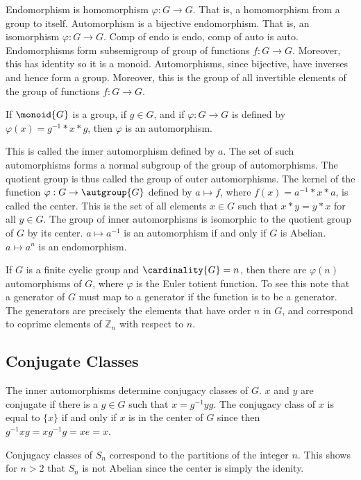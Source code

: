 \documentclass{book}                                                           %
\begin{document}
            Endomorphism is homomorphism $\varphi:G\rightarrow{G}$. That is,
            a homomorphism from a group to itself. Automorphism is a
            bijective endomorphism. That is, an isomorphism
            $\varphi:G\rightarrow{G}$. Comp of endo is endo, comp of auto is
            auto. Endomorphisms form subsemigroup of group of functions
            $f:G\rightarrow{G}$. Moreover, this has identity so it is a
            monoid. Automorphisms, since bijective, have inverses and hence
            form a group. Moreover, this is the group of all invertible
            elements of the group of functions $f:G\rightarrow{G}$.
            \begin{theorem}
                If $\monoid{G}$ is a group, if $g\in{G}$, and if
                $\varphi:G\rightarrow{G}$ is defined by
                $\varphi(x)=g^{\minus{1}}*x*g$, then $\varphi$ is an
                automorphism.
            \end{theorem}
            This is called the inner automorphism defined by $a$. The set
            of such automorphisms forms a normal subgroup of the group of
            automorphisms. The quotient group is thus called the group of
            outer automorphisms. The kernel of the function
            $\varphi:G\rightarrow\autgroup{G}$ defined by
            $a\mapsto{f}$, where $f(x)=a^{\minus{1}}*x*a$, is called the
            center. This is the set of all elements $x\in{G}$ such that
            $x*y=y*x$ for all $y\in{G}$. The group of inner automorphisms is
            isomorphic to the quotient group of $G$ by its center.
            $a\mapsto{a}^{\minus{1}}$ is an automorphism if and only if
            $G$ is Abelian. $a\mapsto{a}^{n}$ is an endomorphism.
            \begin{example}
                If $G$ is a finite cyclic group and $\cardinality{G}=n$,
                then there are $\varphi(n)$ automorphisms of $G$, where
                $\varphi$ is the Euler totient function. To see this note
                that a generator of $G$ must map to a generator if the
                function is to be a generator. The generators are precisely
                the elements that have order $n$ in $G$, and correspond to
                coprime elements of $\mathbb{Z}_{n}$ with respect to $n$.
            \end{example}
        \subsection{Conjugate Classes}
            The inner automorphisms determine conjugacy classes of $G$.
            $x$ and $y$ are conjugate if there is a $g\in{G}$ such that
            $x=g^{\minus{1}}yg$. The conjugacy class of $x$ is equal to
            $\{x\}$ if and only if $x$ is in the center of $G$ since then
            $g^{\minus{1}}xg=xg^{\minus{1}}g=xe=x$.
            \begin{example}
                Conjugacy classes of $S_{n}$ correspond to the partitions of
                the integer $n$. This shows for $n>2$ that $S_{n}$ is not
                Abelian since the center is simply the idenity.
            \end{example}
\end{document}
